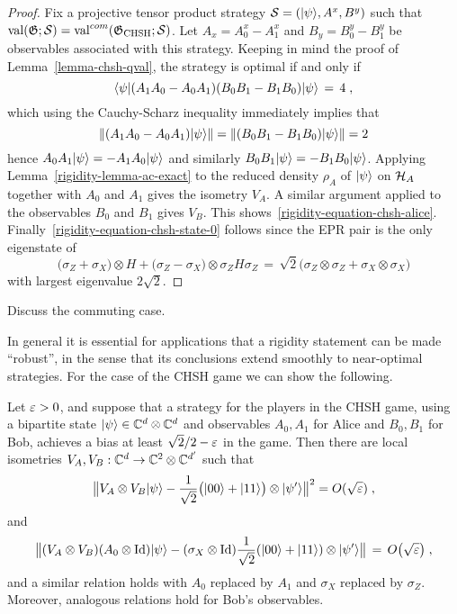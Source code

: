 \begin{proof}
Fix a  projective tensor product strategy $\mathcal{S} = (|\psi\rangle,A^x,B^y)$ such that $\mathrm{val}(\mathfrak{G};\mathcal{S})=\mathrm{val}^{com}(\mathfrak{G}_{\mathrm{CHSH}};\mathcal{S})$. Let $A_x = A^x_0-A^x_1$ and $B_y = B^y_0-B^y_1$ be observables associated with this strategy.
Keeping in mind the proof of Lemma~\ref{lemma-chsh-qval}, the strategy is optimal if and only if 
\begin{equation}\label{equation-exact-1}
\langle\psi|(A_1A_0-A_0A_1) (B_0B_1-B_1B_0)|\psi\rangle \,=\, 4\;,
\end{equation}
which using the Cauchy-Scharz inequality immediately implies that 
\[\|(A_1A_0-A_0A_1) |\psi\rangle\|=\|(B_0B_1-B_1B_0)|\psi\rangle\|=2\]
hence $A_0A_1 |\psi\rangle = - A_1 A_0 |\psi\rangle$ and similarly $B_0B_1 |\psi\rangle = - B_1 B_0 |\psi\rangle$. Applying Lemma~\ref{rigidity-lemma-ac-exact} to the reduced density $\rho_A$ of $|\psi\rangle$ on $\mathcal{H}_A$ together with $A_0$ and $A_1$ gives the isometry $V_A$. A similar argument applied to the observables $B_0$ and $B_1$ gives $V_B$. This shows~\eqref{rigidity-equation-chsh-alice}. Finally~\eqref{rigidity-equation-chsh-state-0} follows since the EPR pair is the only eigenstate of 
\[ \big(\sigma_Z  + \sigma_X \big) \otimes H + \big(\sigma_Z - \sigma_X\big) \otimes \sigma_Z H \sigma_Z \,=\, \sqrt{2}\big( \sigma_Z \otimes \sigma_Z + \sigma_X \otimes \sigma_X \big)\]
with largest eigenvalue $2\sqrt{2}$. 
\end{proof}

\begin{remark} Discuss the commuting case.
\end{remark}


In general it is essential for applications that a rigidity statement can be made ``robust'', in the sense that its conclusions extend smoothly to near-optimal strategies. For the case of the CHSH game we can show the following. 


\begin{theorem}\label{theorem-rigid-chsh}
Let $\varepsilon>0$, and suppose that a strategy for the players  in the CHSH game, using  a bipartite state $|\psi\rangle\in\mathbb{C}^d\otimes \mathbb{C}^d$ and observables $A_0,A_1$ for Alice and $B_0,B_1$ for Bob, achieves a bias at least $\sqrt{2}/2-\varepsilon$ in the game. Then there are local isometries $V_A,V_B:\mathbb{C}^d \to \mathbb{C}^2 \otimes \mathbb{C}^{d'}$ such that 
\begin{equation}\label{eq:chsh-state}
\big\| V_A \otimes V_B |\psi\rangle - \frac{1}{\sqrt{2}}\big(|00\rangle+|11\rangle\big) \otimes |\psi'\rangle \big\|^2 = O(\sqrt{\varepsilon}) \;,
\end{equation}
and 
\begin{equation}\label{eq:chsh-alice}
\big\|( V_A \otimes V_B)( A_0 \otimes \mathop{\rm Id}\nolimits )|\psi\rangle - (\sigma_X \otimes \mathop{\rm Id}\nolimits)\frac{1}{\sqrt{2}}(|00\rangle+|11\rangle) \otimes |\psi'\rangle \big\| \,=\, O\big(\sqrt{\varepsilon}\big)\;,
\end{equation}
and a similar relation holds with $A_0$ replaced by $A_1$ and $\sigma_X$ replaced by $\sigma_Z$. Moreover, analogous relations hold for Bob's observables. 
\end{theorem}


